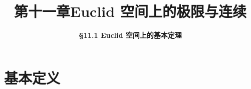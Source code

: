 \everymath{\displaystyle}



\title[第十一章\\
Euclid空间上的极限与连续]{\texorpdfstring{\LARGE \bfseries 第十一章\quad Euclid 空间上的极限与连续}{第十一章 Euclid 空间上的极限与连续}} %
\author[\smaller \S 11.1 Euclid 空间基本定理] %
{\Large \bfseries \S 11.1 Euclid 空间上的基本定理}
\date{}





\begin{frame}

\titlepage %

\end{frame}




\section{基本定义}

